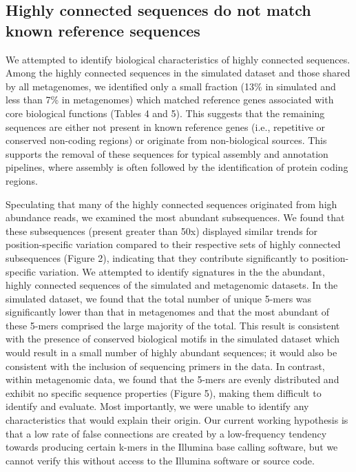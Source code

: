 \documentclass[10pt]{article}
\begin{document}
\subsection*{Highly connected sequences do not match known reference sequences}

We attempted to identify biological characteristics of highly
connected sequences.  Among the highly connected sequences in the
simulated dataset and those shared by all metagenomes, we identified
only a small fraction (13\% in simulated and less than 7\% in
metagenomes) which matched reference genes associated with core
biological functions (Tables 4 and 5).  This suggests that the
remaining sequences are either not present in known reference genes
(i.e., repetitive or conserved non-coding regions) or originate from non-biological
sources.  This supports the removal of these sequences for typical
assembly and annotation pipelines, where assembly is often followed by
the identification of protein coding regions.

Speculating that many of the highly connected sequences originated
from high abundance reads, we examined the most abundant subsequences.
We found that these subsequences (present greater than 50x) displayed
similar trends for position-specific variation compared to their
respective sets of highly connected subsequences (Figure 2),
indicating that they contribute significantly to position-specific
variation.  We attempted to identify signatures in the the abundant,
highly connected sequences of the simulated and metagenomic datasets.
In the simulated dataset, we found that the total number of unique
5-mers was significantly lower than that in metagenomes and that the
most abundant of these 5-mers comprised the large majority of the
total.  This result is consistent with the presence of conserved
biological motifs in the simulated dataset which would result in a
small number of highly abundant sequences; it would also be consistent
with the inclusion of sequencing primers in the data.  In contrast, within
metagenomic data, we found that the 5-mers are evenly distributed and
exhibit no specific sequence properties (Figure 5), making them
difficult to identify and evaluate.  Most importantly, we were unable
to identify any characteristics that would explain their origin.  Our
current working hypothesis is that a low rate of false connections are
created by a low-frequency tendency towards producing certain k-mers
in the Illumina base calling software, but we cannot verify this
without access to the Illumina software or source code.
\end{document}
